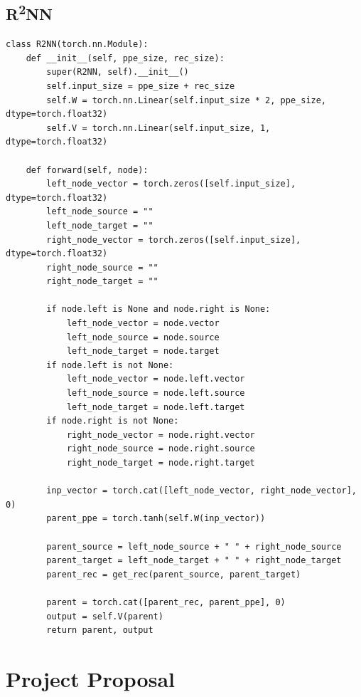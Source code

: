 \documentclass[12pt,a4paper,twoside]{report}
\begin{document}
\section{\texorpdfstring{R\textsuperscript{2}NN}{R2NN}}
\begin{lstlisting}
class R2NN(torch.nn.Module):
    def __init__(self, ppe_size, rec_size):
        super(R2NN, self).__init__()
        self.input_size = ppe_size + rec_size
        self.W = torch.nn.Linear(self.input_size * 2, ppe_size, dtype=torch.float32)
        self.V = torch.nn.Linear(self.input_size, 1, dtype=torch.float32)

    def forward(self, node):
        left_node_vector = torch.zeros([self.input_size], dtype=torch.float32)
        left_node_source = ""
        left_node_target = ""
        right_node_vector = torch.zeros([self.input_size], dtype=torch.float32)
        right_node_source = ""
        right_node_target = ""

        if node.left is None and node.right is None:
            left_node_vector = node.vector
            left_node_source = node.source
            left_node_target = node.target
        if node.left is not None:
            left_node_vector = node.left.vector
            left_node_source = node.left.source
            left_node_target = node.left.target
        if node.right is not None:
            right_node_vector = node.right.vector
            right_node_source = node.right.source
            right_node_target = node.right.target

        inp_vector = torch.cat([left_node_vector, right_node_vector], 0)
        parent_ppe = torch.tanh(self.W(inp_vector))

        parent_source = left_node_source + " " + right_node_source
        parent_target = left_node_target + " " + right_node_target
        parent_rec = get_rec(parent_source, parent_target)

        parent = torch.cat([parent_rec, parent_ppe], 0)
        output = self.V(parent)
        return parent, output
\end{lstlisting}

\chapter{Project Proposal}

\end{document}
